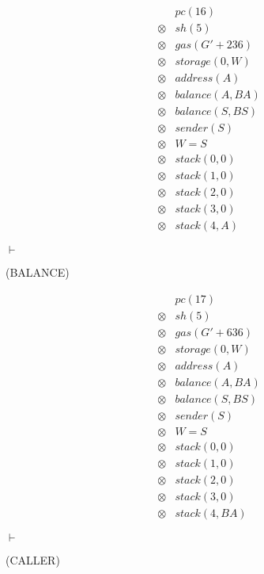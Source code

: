 \[
  \begin{array}{rcl}
    &&pc(16)\\
    &\otimes& sh(5)\\
    &\otimes& gas(G' + 236)\\
    &\otimes& storage(0, W)\\
    &\otimes& address(A)\\
    &\otimes& balance(A, BA)\\
    &\otimes& balance(S, BS)\\
    &\otimes& sender(S)\\
    &\otimes& W = S\\
    &\otimes& stack(0, 0)\\
    &\otimes& stack(1, 0)\\
    &\otimes& stack(2, 0)\\
    &\otimes& stack(3, 0)\\
    &\otimes& stack(4, A)
  \end{array}
\]

$\vdash$ \begin{flushright}(BALANCE)\end{flushright}

\[
  \begin{array}{rcl}
    &&pc(17)\\
    &\otimes& sh(5)\\
    &\otimes& gas(G' + 636)\\
    &\otimes& storage(0, W)\\
    &\otimes& address(A)\\
    &\otimes& balance(A, BA)\\
    &\otimes& balance(S, BS)\\
    &\otimes& sender(S)\\
    &\otimes& W = S\\
    &\otimes& stack(0, 0)\\
    &\otimes& stack(1, 0)\\
    &\otimes& stack(2, 0)\\
    &\otimes& stack(3, 0)\\
    &\otimes& stack(4, BA)
  \end{array}
\]

$\vdash$ \begin{flushright}(CALLER)\end{flushright}


